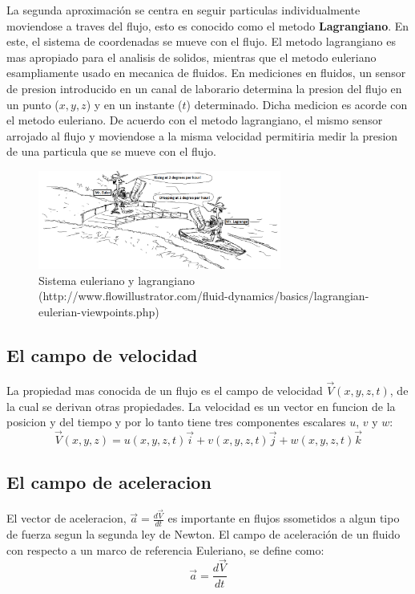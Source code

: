 \documentclass[10pt, oneside]{article}
\begin{document}
La segunda aproximaci\'on se centra en seguir particulas individualmente moviendose a traves del flujo, esto es conocido como el metodo \textbf{Lagrangiano}. En este, el sistema de coordenadas se mueve con el flujo. El metodo lagrangiano es mas apropiado para el analisis de solidos, mientras que el metodo euleriano esampliamente usado en mecanica de fluidos. 
En mediciones en fluidos, un sensor de presion introducido en un canal de laborario determina la presion del flujo en un punto ($x,y,z$) y en un instante ($t$) determinado. Dicha medicion es acorde con el metodo euleriano. De acuerdo con el metodo lagrangiano,  el mismo sensor arrojado al flujo y moviendose a la misma velocidad permitiria medir la presion de una particula que se mueve con el flujo.

\begin{figure}[h]
\centering
\includegraphics[width=8cm]{MaterialDerivative}
\caption{Sistema euleriano y lagrangiano (http://www.flowillustrator.com/fluid-dynamics/basics/lagrangian-eulerian-viewpoints.php)}
\label{eulan}
\end{figure}

\subsection{El campo de velocidad}
La   propiedad mas conocida de un flujo es el campo de velocidad $\vec{V}(x,y,z,t)$, de la cual se derivan otras propiedades. La velocidad es un vector en funcion de la posicion y del tiempo y por lo tanto tiene tres componentes escalares $u$, $v$ y $w$:
$$
\vec{V}(x,y,z)=u(x,y,z,t)\vec{i} + v(x,y,z,t)\vec{j} + w(x,y,z,t)\vec{k}
$$

\subsection{El campo de aceleracion}
El vector de aceleracion, $\vec{a}=\frac{d \vec{V}}{dt}$ es importante en flujos ssometidos a algun tipo de fuerza segun la segunda ley de Newton. El campo de aceleraci\'on de un fluido con respecto a un marco de referencia Euleriano, se define como:
$$
\vec{a}=\frac{d \vec{V}}{dt}
$$
\end{document}
